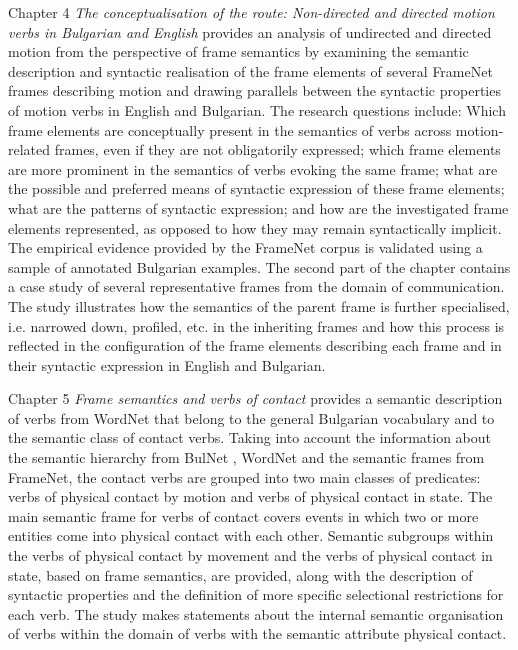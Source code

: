 \begin{refsection}
Chapter 4 \textit{The conceptualisation of the route: Non-directed and directed motion verbs in Bulgarian and English} provides an analysis of undirected and directed motion from the perspective of frame semantics by examining the semantic description and syntactic realisation of the frame elements of several FrameNet frames describing motion and drawing parallels between the syntactic properties of motion verbs in English and Bulgarian. The research questions include: Which frame elements are conceptually present in the semantics of verbs across motion-related frames, even if they are not obligatorily expressed; which frame elements are more prominent in the semantics of verbs evoking the same frame; what are the possible and preferred means of syntactic expression of these frame elements; what are the patterns of syntactic expression; and how are the investigated frame elements represented, as opposed to how they may remain syntactically implicit. The empirical evidence provided by the FrameNet corpus is validated using a sample of annotated Bulgarian examples. The second part of the chapter contains a case study of several representative frames from the domain of communication. The study illustrates how the semantics of the parent frame is further specialised, i.e. narrowed down, profiled, etc. in the inheriting frames and how this process is reflected in the configuration of the frame elements describing each frame and in their syntactic expression in English and Bulgarian. 

Chapter 5 \textit{Frame semantics and verbs of contact} provides a semantic description of verbs from WordNet that belong to the general Bulgarian vocabulary and to the semantic class of contact verbs. Taking into account the information about the semantic hierarchy from BulNet \citep{koeva2021}, WordNet and the semantic frames from FrameNet, the contact verbs are grouped into two main classes of predicates: verbs of physical contact by motion and verbs of physical contact in state. The main semantic frame for verbs of contact covers events in which two or more entities come into physical contact with each other. Semantic subgroups within the verbs of physical contact by movement and the verbs of physical contact in state, based on frame semantics, are provided, along with the description of syntactic properties and the definition of more specific selectional restrictions for each verb. The study makes statements about the internal semantic organisation of verbs within the domain of verbs with the semantic attribute physical contact.


\end{refsection}
